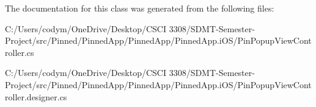 The documentation for this class was generated from the following files\+:\begin{DoxyCompactItemize}
\item 
C\+:/\+Users/codym/\+One\+Drive/\+Desktop/\+C\+S\+C\+I 3308/\+S\+D\+M\+T-\/\+Semester-\/\+Project/src/\+Pinned/\+Pinned\+App/\+Pinned\+App/\+Pinned\+App.\+i\+O\+S/Pin\+Popup\+View\+Controller.\+cs\item 
C\+:/\+Users/codym/\+One\+Drive/\+Desktop/\+C\+S\+C\+I 3308/\+S\+D\+M\+T-\/\+Semester-\/\+Project/src/\+Pinned/\+Pinned\+App/\+Pinned\+App/\+Pinned\+App.\+i\+O\+S/Pin\+Popup\+View\+Controller.\+designer.\+cs\end{DoxyCompactItemize}
